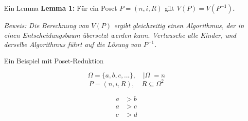 \begin{frame}{Ein Lemma}
  \textbf{Lemma 1:} Für ein Poset $P=(n,i,R)$ gilt $V(P) = V(P^{-1})$.
  \vspace{1mm}

  \textit{Beweis: Die Berechnung von $V(P)$ ergibt gleichzeitig einen Algorithmus, der in einen Entscheidungsbaum übersetzt werden kann. Vertausche alle Kinder, und derselbe Algorithmus führt auf die Lösung von $P^{-1}$.}

\end{frame}

\begin{frame}{Ein Beispiel mit Poset-Reduktion}
  \begin{figure}
    
  \end{figure}

\end{frame}

\begin{frame}{\insertsection}
  $$ \Omega = \{ a,b,c,...\}, \quad |\Omega| = n $$
  $$P = (n,i,R), \quad R \subseteq \Omega^2$$
\end{frame}

\begin{frame}{\insertsection}
  \centering

  \begin{align*}
    a & > b \\
    a & > c \\
    c & > d
  \end{align*}
\end{frame}

